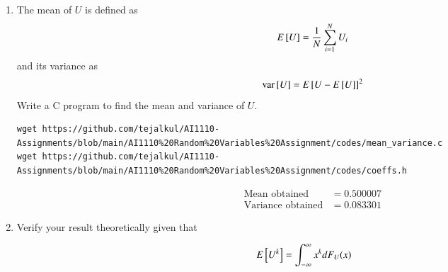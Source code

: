 \documentclass[journal,12pt,twocolumn]{IEEEtran}
\renewcommand\thesection{\arabic{section}}
\begin{document}
\begin{enumerate}[label=\thesection.\arabic*
,ref=\thesection.\theenumi]
\begin{align}  
f_{U}\brak{x} = 
\begin{cases}
1, & x\in (0,1) \\
0, & \text{otherwise}
\end{cases}
\end{align}
\begin{equation}
    F_U(x) = \int_{-\infty}^{x} f_{U}\brak{x} \,dx  \\
\end{equation}
Hence,
If $ x \leq 0 $,
\begin{align}
    F_U(x) &= \int_{-\infty}^{x} f_{U}\brak{x} \,dx  \\
    F_U(x) &= \int_{-\infty}^{x} 0 \,dx  \\
           &= 0
\end{align}
If $0 <x <1$,
\begin{align}
    F_U(x) &= \int_{0}^{x} f_{U}\brak{x} \,dx  \\
    F_U(x) &= \int_{0}^{x} 1 \,dx  \\
           &= x
\end{align}
If $x \geq 1$,
\begin{align}
    F_U(x) &= \int_{1}^{x} f_{U}\brak{x} \,dx  \\
    F_U(x) &= \int_{1}^{x} 0 \,dx  \\
           &= 0
\end{align}
Hence,
\begin{align}  
F_{U}\brak{x} = 
\begin{cases}
x, & x\in (0,1) \\
0, & \text{otherwise}
\end{cases}
\end{align}
\item
The mean of $U$ is defined as
%
\begin{equation}
E{}\left[U\right] = \frac{1}{N}\sum_{i=1}^{N}U_i
\end{equation}
%
and its variance as
%
\begin{equation}
\text{var}{}\left[U\right] = E{}\left[U- E{}\left[U\right]\right]^2 
\end{equation}
Write a C program to  find the mean and variance of $U$.

\solution
\begin{lstlisting}
wget https://github.com/tejalkul/AI1110-Assignments/blob/main/AI1110%20Random%20Variables%20Assignment/codes/mean_variance.c
wget https://github.com/tejalkul/AI1110-Assignments/blob/main/AI1110%20Random%20Variables%20Assignment/codes/coeffs.h
\end{lstlisting}
\begin{align}
    \text{Mean obtained} &= 0.500007 \\
    \text{Variance obtained} &= 0.083301
\end{align}

\item Verify your result theoretically given that

\end{enumerate}
%
\begin{equation}
E{}\left[U^k\right] = \int_{-\infty}^{\infty}x^kdF_{U}(x)
\end{equation}
\solution
\end{document}
